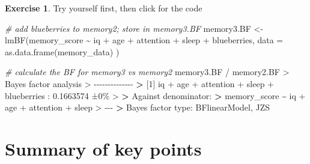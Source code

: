 \documentclass[
]{book}
\newenvironment{Shaded}{\begin{snugshade}}{\end{snugshade}}
\newcommand{\AttributeTok}[1]{\textcolor[rgb]{0.77,0.63,0.00}{#1}}
\newcommand{\CommentTok}[1]{\textcolor[rgb]{0.56,0.35,0.01}{\textit{#1}}}
\newcommand{\DecValTok}[1]{\textcolor[rgb]{0.00,0.00,0.81}{#1}}
\newcommand{\ErrorTok}[1]{\textcolor[rgb]{0.64,0.00,0.00}{\textbf{#1}}}
\newcommand{\FloatTok}[1]{\textcolor[rgb]{0.00,0.00,0.81}{#1}}
\newcommand{\FunctionTok}[1]{\textcolor[rgb]{0.00,0.00,0.00}{#1}}
\newcommand{\NormalTok}[1]{#1}
\newcommand{\OtherTok}[1]{\textcolor[rgb]{0.56,0.35,0.01}{#1}}
\newcommand{\SpecialCharTok}[1]{\textcolor[rgb]{0.00,0.00,0.00}{#1}}
\theoremstyle{definition}
\theoremstyle{definition}
\theoremstyle{definition}
\newtheorem{exercise}{Exercise}[chapter]
\theoremstyle{definition}
\theoremstyle{remark}
\begin{document}
\begin{exercise}
Try yourself first, then click for the code

\begin{Shaded}
\begin{Highlighting}[]
\CommentTok{\# add blueberries to memory2; store in memory3.BF}
\NormalTok{memory3.BF }\OtherTok{\textless{}{-}} \FunctionTok{lmBF}\NormalTok{(memory\_score }\SpecialCharTok{\textasciitilde{}}\NormalTok{ iq }\SpecialCharTok{+}\NormalTok{ age }\SpecialCharTok{+}\NormalTok{ attention }\SpecialCharTok{+}\NormalTok{ sleep }\SpecialCharTok{+}\NormalTok{ blueberries, }\AttributeTok{data =} \FunctionTok{as.data.frame}\NormalTok{(memory\_data) )}

\CommentTok{\# calculate the BF for memory3 vs memory2}
\NormalTok{memory3.BF }\SpecialCharTok{/}\NormalTok{ memory2.BF}
\SpecialCharTok{\textgreater{}}\NormalTok{ Bayes factor analysis}
\SpecialCharTok{\textgreater{}} \SpecialCharTok{{-}{-}{-}{-}{-}{-}{-}{-}{-}{-}{-}{-}{-}{-}}
\ErrorTok{\textgreater{}}\NormalTok{ [}\DecValTok{1}\NormalTok{] iq }\SpecialCharTok{+}\NormalTok{ age }\SpecialCharTok{+}\NormalTok{ attention }\SpecialCharTok{+}\NormalTok{ sleep }\SpecialCharTok{+}\NormalTok{ blueberries }\SpecialCharTok{:} \FloatTok{0.1663574}\NormalTok{ ±}\DecValTok{0}\NormalTok{\%}
\SpecialCharTok{\textgreater{}} 
\ErrorTok{\textgreater{}}\NormalTok{ Against denominator}\SpecialCharTok{:}
\ErrorTok{\textgreater{}}\NormalTok{   memory\_score }\SpecialCharTok{\textasciitilde{}}\NormalTok{ iq }\SpecialCharTok{+}\NormalTok{ age }\SpecialCharTok{+}\NormalTok{ attention }\SpecialCharTok{+}\NormalTok{ sleep }
\SpecialCharTok{\textgreater{}} \SpecialCharTok{{-}{-}{-}}
\ErrorTok{\textgreater{}}\NormalTok{ Bayes factor type}\SpecialCharTok{:}\NormalTok{ BFlinearModel, JZS}
\end{Highlighting}
\end{Shaded}

\end{exercise}

\hypertarget{summary-of-key-points-1}{%
\section{Summary of key points}\label{summary-of-key-points-1}}
\end{document}
